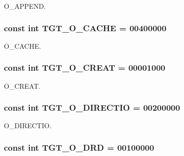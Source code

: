O\_\-APPEND. \hypertarget{classAlphaTru64_ab30a547e309825ec5f9c5d11a6da543c}{
\subsubsection[{TGT\_\-O\_\-CACHE}]{\setlength{\rightskip}{0pt plus 5cm}const int {\bf TGT\_\-O\_\-CACHE} = 00400000}}
\label{classAlphaTru64_ab30a547e309825ec5f9c5d11a6da543c}


O\_\-CACHE. \hypertarget{classAlphaTru64_aec02e04ca367e6c3f4b46e4edc12efac}{
\subsubsection[{TGT\_\-O\_\-CREAT}]{\setlength{\rightskip}{0pt plus 5cm}const int {\bf TGT\_\-O\_\-CREAT} = 00001000}}
\label{classAlphaTru64_aec02e04ca367e6c3f4b46e4edc12efac}


O\_\-CREAT. \hypertarget{classAlphaTru64_a0a80dc00bd46d433f1ff0d38da2f5ded}{
\subsubsection[{TGT\_\-O\_\-DIRECTIO}]{\setlength{\rightskip}{0pt plus 5cm}const int {\bf TGT\_\-O\_\-DIRECTIO} = 00200000}}
\label{classAlphaTru64_a0a80dc00bd46d433f1ff0d38da2f5ded}


O\_\-DIRECTIO. \hypertarget{classAlphaTru64_a83feaef06c27596d44d489ec51e197fd}{
\subsubsection[{TGT\_\-O\_\-DRD}]{\setlength{\rightskip}{0pt plus 5cm}const int {\bf TGT\_\-O\_\-DRD} = 00100000}}
\label{classAlphaTru64_a83feaef06c27596d44d489ec51e197fd}


